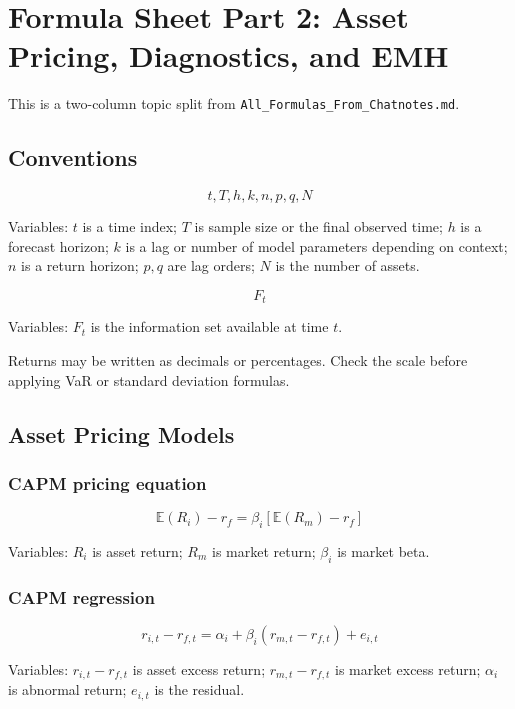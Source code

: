 \documentclass[
  8pt,
  twocolumn]{extarticle}
\author{}
\date{}
\begin{document}
\section{Formula Sheet Part 2: Asset Pricing, Diagnostics, and
EMH}\label{formula-sheet-part-2-asset-pricing-diagnostics-and-emh}

This is a two-column topic split from
\texttt{All\_Formulas\_From\_Chatnotes.md}.

\subsection{Conventions}\label{conventions}

\[
t,T,h,k,n,p,q,N
\]

Variables: \(t\) is a time index; \(T\) is sample size or the final
observed time; \(h\) is a forecast horizon; \(k\) is a lag or number of
model parameters depending on context; \(n\) is a return horizon;
\(p,q\) are lag orders; \(N\) is the number of assets.

\[
F_t
\]

Variables: \(F_t\) is the information set available at time \(t\).

Returns may be written as decimals or percentages. Check the scale
before applying VaR or standard deviation formulas.

\subsection{Asset Pricing Models}\label{asset-pricing-models}

\subsubsection{CAPM pricing equation}\label{capm-pricing-equation}

\[
\mathbb E(R_i)-r_f=\beta_i[\mathbb E(R_m)-r_f]
\]

Variables: \(R_i\) is asset return; \(R_m\) is market return;
\(\beta_i\) is market beta.

\subsubsection{CAPM regression}\label{capm-regression}

\[
r_{i,t}-r_{f,t}=\alpha_i+\beta_i(r_{m,t}-r_{f,t})+e_{i,t}
\]

Variables: \(r_{i,t}-r_{f,t}\) is asset excess return;
\(r_{m,t}-r_{f,t}\) is market excess return; \(\alpha_i\) is abnormal
return; \(e_{i,t}\) is the residual.
\end{document}
